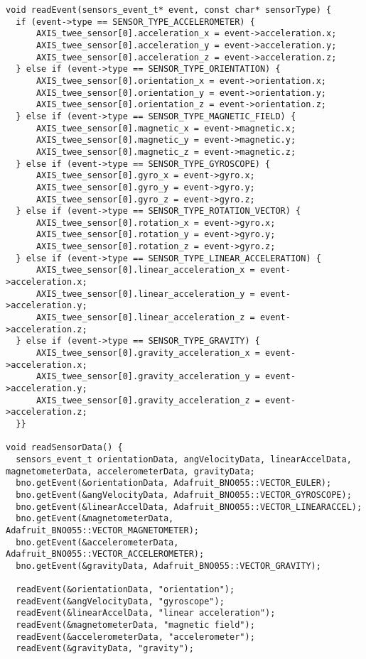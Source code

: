 \begin{lstlisting}
void readEvent(sensors_event_t* event, const char* sensorType) {
  if (event->type == SENSOR_TYPE_ACCELEROMETER) {
      AXIS_twee_sensor[0].acceleration_x = event->acceleration.x;
      AXIS_twee_sensor[0].acceleration_y = event->acceleration.y;
      AXIS_twee_sensor[0].acceleration_z = event->acceleration.z;
  } else if (event->type == SENSOR_TYPE_ORIENTATION) {
      AXIS_twee_sensor[0].orientation_x = event->orientation.x;
      AXIS_twee_sensor[0].orientation_y = event->orientation.y;
      AXIS_twee_sensor[0].orientation_z = event->orientation.z;
  } else if (event->type == SENSOR_TYPE_MAGNETIC_FIELD) {
      AXIS_twee_sensor[0].magnetic_x = event->magnetic.x;
      AXIS_twee_sensor[0].magnetic_y = event->magnetic.y;
      AXIS_twee_sensor[0].magnetic_z = event->magnetic.z;
  } else if (event->type == SENSOR_TYPE_GYROSCOPE) {
      AXIS_twee_sensor[0].gyro_x = event->gyro.x;
      AXIS_twee_sensor[0].gyro_y = event->gyro.y;
      AXIS_twee_sensor[0].gyro_z = event->gyro.z;
  } else if (event->type == SENSOR_TYPE_ROTATION_VECTOR) {
      AXIS_twee_sensor[0].rotation_x = event->gyro.x;
      AXIS_twee_sensor[0].rotation_y = event->gyro.y;
      AXIS_twee_sensor[0].rotation_z = event->gyro.z;
  } else if (event->type == SENSOR_TYPE_LINEAR_ACCELERATION) {
      AXIS_twee_sensor[0].linear_acceleration_x = event->acceleration.x;
      AXIS_twee_sensor[0].linear_acceleration_y = event->acceleration.y;
      AXIS_twee_sensor[0].linear_acceleration_z = event->acceleration.z;
  } else if (event->type == SENSOR_TYPE_GRAVITY) {
      AXIS_twee_sensor[0].gravity_acceleration_x = event->acceleration.x;
      AXIS_twee_sensor[0].gravity_acceleration_y = event->acceleration.y;
      AXIS_twee_sensor[0].gravity_acceleration_z = event->acceleration.z;
  }}

void readSensorData() {
  sensors_event_t orientationData, angVelocityData, linearAccelData, magnetometerData, accelerometerData, gravityData;
  bno.getEvent(&orientationData, Adafruit_BNO055::VECTOR_EULER);
  bno.getEvent(&angVelocityData, Adafruit_BNO055::VECTOR_GYROSCOPE);
  bno.getEvent(&linearAccelData, Adafruit_BNO055::VECTOR_LINEARACCEL);
  bno.getEvent(&magnetometerData, Adafruit_BNO055::VECTOR_MAGNETOMETER);
  bno.getEvent(&accelerometerData, Adafruit_BNO055::VECTOR_ACCELEROMETER);
  bno.getEvent(&gravityData, Adafruit_BNO055::VECTOR_GRAVITY);

  readEvent(&orientationData, "orientation");
  readEvent(&angVelocityData, "gyroscope");
  readEvent(&linearAccelData, "linear acceleration");
  readEvent(&magnetometerData, "magnetic field");
  readEvent(&accelerometerData, "accelerometer");
  readEvent(&gravityData, "gravity");


\end{lstlisting}
